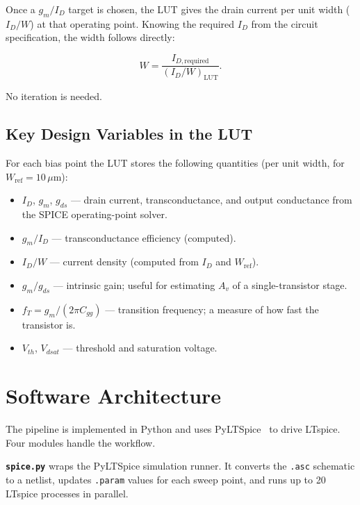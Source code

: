 \documentclass[conference]{IEEEtran}
\begin{document}
Once a $g_m/I_D$ target is chosen, the LUT gives the drain current per
unit width ($I_D/W$) at that operating point.  Knowing the required
$I_D$ from the circuit specification, the width follows directly:

\begin{equation}
  W = \frac{I_{D,\text{required}}}{(I_D / W)_{\text{LUT}}}.
  \label{eq:width}
\end{equation}

No iteration is needed.

\subsection{Key Design Variables in the LUT}

For each bias point the LUT stores the following quantities (per unit
width, for $W_{\text{ref}} = 10\,\mu\text{m}$):

\begin{itemize}
  \item $I_D$, $g_m$, $g_{ds}$ --- drain current, transconductance, and
        output conductance from the SPICE operating-point solver.
  \item $g_m/I_D$ --- transconductance efficiency (computed).
  \item $I_D/W$ --- current density (computed from $I_D$ and $W_{\text{ref}}$).
  \item $g_m/g_{ds}$ --- intrinsic gain; useful for estimating $A_v$ of a
        single-transistor stage.
  \item $f_T = g_m / (2\pi C_{gg})$ --- transition frequency; a measure of
        how fast the transistor is.
  \item $V_{th}$, $V_{dsat}$ --- threshold and saturation voltage.
\end{itemize}

\section{Software Architecture}
\label{sec:tool}

The pipeline is implemented in Python and uses PyLTSpice~\cite{pyltspice}
to drive LTspice.  Four modules handle the workflow.

\textbf{\texttt{spice.py}} wraps the PyLTSpice simulation runner.  It
converts the \texttt{.asc} schematic to a netlist, updates \texttt{.param}
values for each sweep point, and runs up to 20 LTspice processes in
parallel.
\end{document}
